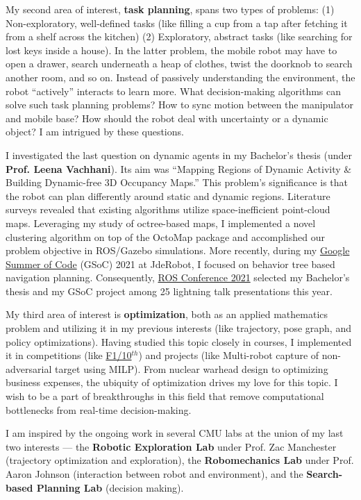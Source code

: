 \documentclass[12pt]{article}
\begin{document}
My second area of interest, \textbf{task planning}, spans two types of problems: (1) Non-exploratory, well-defined tasks (like filling a cup from a tap after fetching it from a shelf across the kitchen) (2) Exploratory, abstract tasks (like searching for lost keys inside a house). In the latter problem, the mobile robot may have to open a drawer, search underneath a heap of clothes, twist the doorknob to search another room, and so on. Instead of passively understanding the environment, the robot “actively” interacts to learn more. What decision-making algorithms can solve such task planning problems? How to sync motion between the manipulator and mobile base? How should the robot deal with uncertainty or a dynamic object? I am intrigued by these questions.

I investigated the last question on dynamic agents in my Bachelor’s thesis (under \textbf{Prof. Leena Vachhani}). Its aim was “Mapping Regions of Dynamic Activity \& Building Dynamic-free 3D Occupancy Maps.” This problem’s significance is that the robot can plan differently around static and dynamic regions. Literature surveys revealed that existing algorithms utilize space-inefficient point-cloud maps. Leveraging my study of octree-based maps, I implemented a novel clustering algorithm on top of the OctoMap package and accomplished our problem objective in ROS/Gazebo simulations. More recently, during my \href{https://summerofcode.withgoogle.com/archive/}{Google Summer of Code} (GSoC) 2021 at JdeRobot, I focused on behavior tree based navigation planning. Consequently, \href{https://roscon.ros.org/world/2021/}{ROS Conference 2021} selected my Bachelor’s thesis and my GSoC project among 25 lightning talk presentations this year.

My third area of interest is \textbf{optimization}, both as an applied mathematics problem and utilizing it in my previous interests (like trajectory, pose graph, and policy optimizations). Having studied this topic closely in courses, I  implemented it in competitions (like \href{https://f1tenth.org/iros2020.html}{F1/10$^{th}$}) and projects (like Multi-robot capture of non-adversarial target using MILP). From nuclear warhead design to optimizing business expenses, the ubiquity of optimization drives my love for this topic. I wish to be a part of breakthroughs in this field that remove computational bottlenecks from real-time decision-making.

I am inspired by the ongoing work in several CMU labs at the union of my last two interests — the \textbf{Robotic Exploration Lab} under Prof. Zac Manchester (trajectory optimization and exploration), the \textbf{Robomechanics Lab} under Prof. Aaron Johnson (interaction between robot and environment), and the \textbf{Search-based Planning Lab} (decision making).
\end{document}
